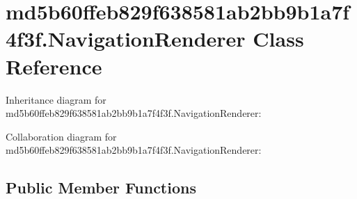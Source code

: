 \hypertarget{classmd5b60ffeb829f638581ab2bb9b1a7f4f3f_1_1_navigation_renderer}{}\section{md5b60ffeb829f638581ab2bb9b1a7f4f3f.\+Navigation\+Renderer Class Reference}
\label{classmd5b60ffeb829f638581ab2bb9b1a7f4f3f_1_1_navigation_renderer}


Inheritance diagram for md5b60ffeb829f638581ab2bb9b1a7f4f3f.\+Navigation\+Renderer\+:


Collaboration diagram for md5b60ffeb829f638581ab2bb9b1a7f4f3f.\+Navigation\+Renderer\+:
\subsection*{Public Member Functions}
